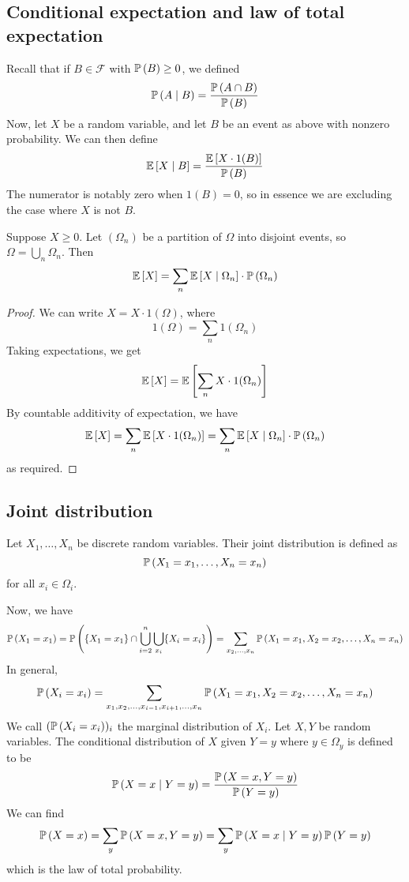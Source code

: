 \subsection{Conditional expectation and law of total expectation}
Recall that if \(B \in \mathcal F\) with \(\mathbb{P}\left({B}\right) \geq 0\), we defined
\[
	\mathbb{P}\left({A \mid B}\right) = \frac{\mathbb{P}\left({A \cap B}\right)}{\mathbb{P}\left({B}\right)}
\]
Now, let \(X\) be a random variable, and let \(B\) be an event as above with nonzero probability.
We can then define
\[
	\mathbb{E}\left[{X \mid B}\right] = \frac{\mathbb{E}\left[{X \cdot 1(B)}\right]}{\mathbb{P}\left({B}\right)}
\]
The numerator is notably zero when \(1(B) = 0\), so in essence we are excluding the case where \(X\) is not \(B\).
\begin{theorem}
	Suppose \(X \geq 0\).
	Let \((\Omega_n)\) be a partition of \(\Omega\) into disjoint events, so \(\Omega = \bigcup_n \Omega_n\).
	Then
	\[
		\mathbb{E}\left[{X}\right] = \sum_n \mathbb{E}\left[{X \mid \Omega_n}\right] \cdot \mathbb{P}\left({\Omega_n}\right)
	\]
\end{theorem}
\begin{proof}
	We can write \(X = X \cdot 1(\Omega)\), where
	\[
		1(\Omega) = \sum_n 1(\Omega_n)
	\]
	Taking expectations, we get
	\[
		\mathbb{E}\left[{X}\right] = \mathbb{E}\left[{ \sum_{n} X \cdot 1(\Omega_n) }\right]
	\]
	By countable additivity of expectation, we have
	\[
		\mathbb{E}\left[{X}\right] = \sum_{n} \mathbb{E}\left[{ X \cdot 1(\Omega_n) }\right] = \sum_n \mathbb{E}\left[{X \mid \Omega_n}\right] \cdot \mathbb{P}\left({\Omega_n}\right)
	\]
	as required.
\end{proof}

\subsection{Joint distribution}
\begin{definition}
	Let \(X_1, \dots, X_n\) be discrete random variables.
	Their joint distribution is defined as
	\[
		\mathbb{P}\left({X_1 = x_1, \dots, X_n = x_n}\right)
	\]
	for all \(x_i \in \Omega_i\).
\end{definition}
Now, we have
\[
	\mathbb{P}\left({X_1 = x_1}\right) = \mathbb{P}\left({\{ X_1 = x_1\} \cap \bigcup_{i=2}^n \bigcup_{x_i} \{ X_i = x_i \} }\right) = \sum_{x_2, \dots, x_n} \mathbb{P}\left({X_1 = x_1, X_2 = x_2, \dots, X_n = x_n}\right)
\]
In general,
\[
	\mathbb{P}\left({X_i = x_i}\right) = \sum_{x_1, x_2, \dots, x_{i-1}, x_{i+1}, \dots, x_n} \mathbb{P}\left({X_1 = x_1, X_2 = x_2, \dots, X_n = x_n}\right)
\]
We call \((\mathbb{P}\left({X_i = x_i}\right))_i\) the marginal distribution of \(X_i\).
Let \(X, Y\) be random variables.
The conditional distribution of \(X\) given \(Y = y\) where \(y \in \Omega_y\) is defined to be
\[
	\mathbb{P}\left({X = x \mid Y = y}\right) = \frac{\mathbb{P}\left({X = x, Y = y}\right)}{\mathbb{P}\left({Y = y}\right)}
\]
We can find
\[
	\mathbb{P}\left({X = x}\right) = \sum_y \mathbb{P}\left({X = x, Y = y}\right) = \sum_y \mathbb{P}\left({X = x \mid Y = y}\right) \mathbb{P}\left({Y = y}\right)
\]
which is the law of total probability.

